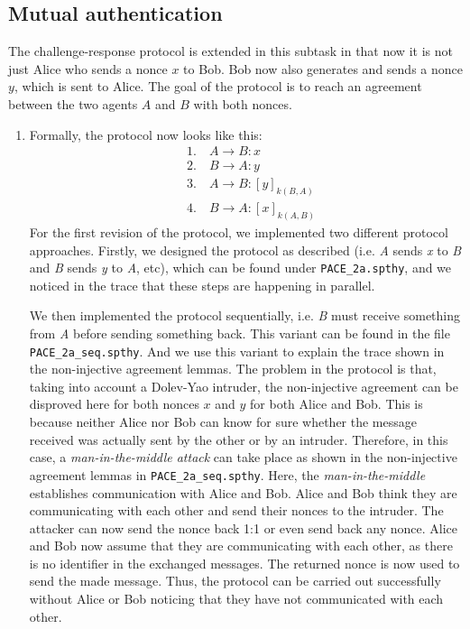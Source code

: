 \documentclass[a4paper,11pt]{scrartcl}
\begin{document}
\subsection{Mutual authentication}
The challenge-response protocol is extended in this subtask in that now it is not just Alice who sends a nonce $x$ to Bob.  Bob now also generates and sends a nonce $y$,  which is sent to Alice. The goal of the protocol is to reach an agreement between the two agents $A$ and $B$ with both nonces.
\begin{enumerate}[label=\alph*)]
	\item Formally, the protocol now looks like this:
\begin{align*}
&\text{1.} \quad A \rightarrow B: x\\
&\text{2.} \quad B \rightarrow A: y\\
&\text{3.} \quad A \rightarrow B: [y]_{k(B,A)}\\
&\text{4.} \quad B \rightarrow A: [x]_{k(A,B)}
\end{align*}
For the first revision of the protocol, we implemented two different protocol approaches. Firstly, we designed the protocol as described (i.e. \emph{A} sends \emph{x} to \emph{B} and \emph{B} sends \emph{y} to \emph{A}, etc), which can be found under \texttt{PACE\_2a.spthy}, and we noticed in the trace that these steps are happening in parallel. 

We then implemented the protocol sequentially, i.e. \emph{B} must receive something from \emph{A} before sending something back. This variant can be found in the file \texttt{PACE\_2a\_seq.spthy}. And we use this variant to explain the trace shown in the non-injective agreement lemmas.
The problem in the protocol is that,  taking into account a Dolev-Yao intruder,  the non-injective agreement can be disproved here for both nonces $x$ and $y$ for both Alice and Bob. This is because neither Alice nor Bob can know for sure whether the message received was actually sent by the other or by an intruder.  Therefore, in this case,  a \textit{man-in-the-middle attack} can take place as shown in the non-injective agreement lemmas in \texttt{PACE\_2a\_seq.spthy}.  \newline
Here, the \textit{man-in-the-middle} establishes communication with Alice and Bob.  Alice and Bob think they are communicating with each other and send their nonces to the intruder. The attacker can now send the nonce back 1:1 or even send back any nonce.  Alice and Bob now assume that they are communicating with each other,  as there is no identifier in the exchanged messages.  The returned nonce is now used to send the made message.  Thus,  the protocol can be carried out successfully without Alice or Bob noticing that they have not communicated with each other.


\end{enumerate}
\end{document}
